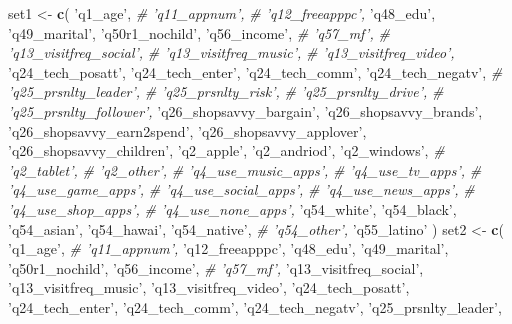 \documentclass[]{article}
\newenvironment{Shaded}{\begin{snugshade}}{\end{snugshade}}
\newcommand{\KeywordTok}[1]{\textcolor[rgb]{0.13,0.29,0.53}{\textbf{#1}}}
\newcommand{\StringTok}[1]{\textcolor[rgb]{0.31,0.60,0.02}{#1}}
\newcommand{\CommentTok}[1]{\textcolor[rgb]{0.56,0.35,0.01}{\textit{#1}}}
\newcommand{\NormalTok}[1]{#1}
\begin{document}
\begin{Shaded}
\begin{Highlighting}[]
\NormalTok{set1 <-}\StringTok{ }\KeywordTok{c}\NormalTok{(}
  \StringTok{'q1_age'}\NormalTok{,}
  \CommentTok{# 'q11_appnum',}
  \CommentTok{# 'q12_freeapppc',}
  \StringTok{'q48_edu'}\NormalTok{,}
  \StringTok{'q49_marital'}\NormalTok{,}
  \StringTok{'q50r1_nochild'}\NormalTok{,}
  \StringTok{'q56_income'}\NormalTok{,}
  \CommentTok{# 'q57_mf',}
  \CommentTok{# 'q13_visitfreq_social',}
  \CommentTok{# 'q13_visitfreq_music',}
  \CommentTok{# 'q13_visitfreq_video',}
  \StringTok{'q24_tech_posatt'}\NormalTok{,}
  \StringTok{'q24_tech_enter'}\NormalTok{,}
  \StringTok{'q24_tech_comm'}\NormalTok{,}
  \StringTok{'q24_tech_negatv'}\NormalTok{,}
  \CommentTok{# 'q25_prsnlty_leader',}
  \CommentTok{# 'q25_prsnlty_risk',}
  \CommentTok{# 'q25_prsnlty_drive',}
  \CommentTok{# 'q25_prsnlty_follower',}
  \StringTok{'q26_shopsavvy_bargain'}\NormalTok{,}
  \StringTok{'q26_shopsavvy_brands'}\NormalTok{,}
  \StringTok{'q26_shopsavvy_earn2spend'}\NormalTok{,}
  \StringTok{'q26_shopsavvy_applover'}\NormalTok{,}
  \StringTok{'q26_shopsavvy_children'}\NormalTok{,}
  \StringTok{'q2_apple'}\NormalTok{,}
  \StringTok{'q2_andriod'}\NormalTok{,}
  \StringTok{'q2_windows'}\NormalTok{,}
  \CommentTok{# 'q2_tablet',}
  \CommentTok{# 'q2_other',}
  \CommentTok{# 'q4_use_music_apps',}
  \CommentTok{# 'q4_use_tv_apps',}
  \CommentTok{# 'q4_use_game_apps',}
  \CommentTok{# 'q4_use_social_apps',}
  \CommentTok{# 'q4_use_news_apps',}
  \CommentTok{# 'q4_use_shop_apps',}
  \CommentTok{# 'q4_use_none_apps',}
  \StringTok{'q54_white'}\NormalTok{,}
  \StringTok{'q54_black'}\NormalTok{,}
  \StringTok{'q54_asian'}\NormalTok{,}
  \StringTok{'q54_hawai'}\NormalTok{,}
  \StringTok{'q54_native'}\NormalTok{,}
  \CommentTok{# 'q54_other',}
  \StringTok{'q55_latino'}
\NormalTok{  )}
\NormalTok{set2 <-}\StringTok{ }\KeywordTok{c}\NormalTok{(}
  \StringTok{'q1_age'}\NormalTok{,}
  \CommentTok{# 'q11_appnum',}
  \StringTok{'q12_freeapppc'}\NormalTok{,}
  \StringTok{'q48_edu'}\NormalTok{,}
  \StringTok{'q49_marital'}\NormalTok{,}
  \StringTok{'q50r1_nochild'}\NormalTok{,}
  \StringTok{'q56_income'}\NormalTok{,}
  \CommentTok{# 'q57_mf',}
  \StringTok{'q13_visitfreq_social'}\NormalTok{,}
  \StringTok{'q13_visitfreq_music'}\NormalTok{,}
  \StringTok{'q13_visitfreq_video'}\NormalTok{,}
  \StringTok{'q24_tech_posatt'}\NormalTok{,}
  \StringTok{'q24_tech_enter'}\NormalTok{,}
  \StringTok{'q24_tech_comm'}\NormalTok{,}
  \StringTok{'q24_tech_negatv'}\NormalTok{,}
  \StringTok{'q25_prsnlty_leader'}\NormalTok{,}

\end{Highlighting}
\end{Shaded}
\end{document}
